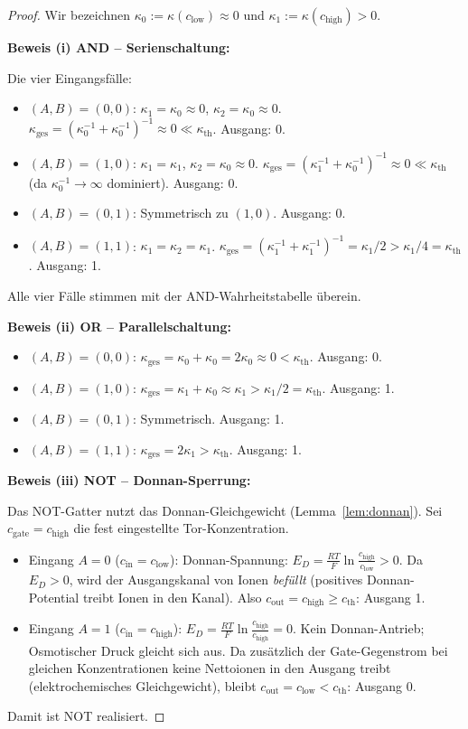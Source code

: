 ﻿\documentclass[a4paper,12pt]{article}
\theoremstyle{plain}
\theoremstyle{definition}
\theoremstyle{remark}
\newcommand{\cth}{c_{\mathrm{th}}}
\newcommand{\chigh}{c_{\mathrm{high}}}
\newcommand{\clow}{c_{\mathrm{low}}}
\newcommand{\kth}{\kappa_{\mathrm{th}}}
\newcommand{\kges}{\kappa_{\mathrm{ges}}}
\begin{document}
\begin{proof}
Wir bezeichnen $\kappa_0 := \kappa(\clow) \approx 0$ und
$\kappa_1 := \kappa(\chigh) > 0$.

\textbf{Beweis (i) AND -- Serienschaltung:}

Die vier Eingangsf\"alle:
\begin{itemize}
\item $(A,B) = (0,0)$: $\kappa_1 = \kappa_0 \approx 0$, $\kappa_2 = \kappa_0 \approx 0$.
  $\kges = (\kappa_0^{-1}+\kappa_0^{-1})^{-1} \approx 0 \ll \kth$. Ausgang: 0. \checkmark
\item $(A,B) = (1,0)$: $\kappa_1 = \kappa_1$, $\kappa_2 = \kappa_0 \approx 0$.
  $\kges = (\kappa_1^{-1} + \kappa_0^{-1})^{-1} \approx 0 \ll \kth$
  (da $\kappa_0^{-1} \to \infty$ dominiert). Ausgang: 0. \checkmark
\item $(A,B) = (0,1)$: Symmetrisch zu $(1,0)$. Ausgang: 0. \checkmark
\item $(A,B) = (1,1)$: $\kappa_1 = \kappa_2 = \kappa_1$.
  $\kges = (\kappa_1^{-1}+\kappa_1^{-1})^{-1} = \kappa_1/2 > \kappa_1/4 = \kth$.
  Ausgang: 1. \checkmark
\end{itemize}
Alle vier F\"alle stimmen mit der AND-Wahrheitstabelle \"uberein.

\textbf{Beweis (ii) OR -- Parallelschaltung:}

\begin{itemize}
\item $(A,B) = (0,0)$: $\kges = \kappa_0 + \kappa_0 = 2\kappa_0 \approx 0 < \kth$. Ausgang: 0. \checkmark
\item $(A,B) = (1,0)$: $\kges = \kappa_1 + \kappa_0 \approx \kappa_1 > \kappa_1/2 = \kth$. Ausgang: 1. \checkmark
\item $(A,B) = (0,1)$: Symmetrisch. Ausgang: 1. \checkmark
\item $(A,B) = (1,1)$: $\kges = 2\kappa_1 > \kth$. Ausgang: 1. \checkmark
\end{itemize}

\textbf{Beweis (iii) NOT -- Donnan-Sperrung:}

Das NOT-Gatter nutzt das Donnan-Gleichgewicht (Lemma~\ref{lem:donnan}).
Sei $c_{\mathrm{gate}} = \chigh$ die fest eingestellte Tor-Konzentration.
\begin{itemize}
\item Eingang $A = 0$ ($c_{\mathrm{in}} = \clow$):
  Donnan-Spannung: $E_D = \frac{RT}{F}\ln\frac{\chigh}{\clow} > 0$.
  Da $E_D > 0$, wird der Ausgangskanal von Ionen \emph{bef\"ullt}
  (positives Donnan-Potential treibt Ionen in den Kanal).
  Also $c_{\mathrm{out}} = \chigh \geq \cth$: Ausgang 1. \checkmark
\item Eingang $A = 1$ ($c_{\mathrm{in}} = \chigh$):
  $E_D = \frac{RT}{F}\ln\frac{\chigh}{\chigh} = 0$.
  Kein Donnan-Antrieb; Osmotischer Druck gleicht sich aus.
  Da zus\"atzlich der Gate-Gegenstrom bei gleichen Konzentrationen
  keine Nettoionen in den Ausgang treibt (elektrochemisches Gleichgewicht),
  bleibt $c_{\mathrm{out}} = \clow < \cth$: Ausgang 0. \checkmark
\end{itemize}
Damit ist NOT realisiert. \checkmark
\end{proof}
\end{document}
